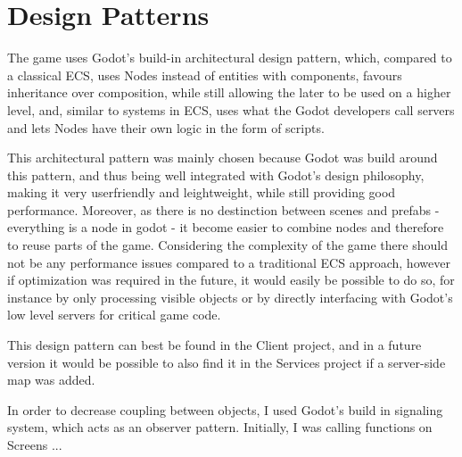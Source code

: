 \documentclass{article}
\begin{document}
\section{Design Patterns}
The game uses Godot's build-in architectural design pattern, which, compared to a classical ECS, uses Nodes instead of entities with components, favours inheritance over composition, while still allowing the later to be used on a higher level, and, similar to systems in ECS, uses what the Godot developers call servers and lets Nodes have their own logic in the form of scripts. 

This architectural pattern was mainly chosen because Godot was build around this pattern, and thus being well integrated with Godot's design philosophy, making it very userfriendly and leightweight, while still providing good performance. Moreover, as there is no destinction between scenes and prefabs - everything is a node in godot - it become easier to combine nodes and therefore to  reuse parts of the game. Considering the complexity of the game there should not be any performance issues compared to a traditional ECS approach, however if optimization was required in the future, it would easily be possible to do so, for instance  by only processing visible objects or by directly interfacing with Godot's low level servers for critical game code. 

This design pattern can best be found in the Client project, and in a future version it would be possible to also find it in the Services project if a server-side map was added.

\bigskip
\noindent
In order to decrease coupling between objects, I used Godot's build in signaling system, which acts as an observer pattern. Initially, I was calling functions on Screens ...
\end{document}

